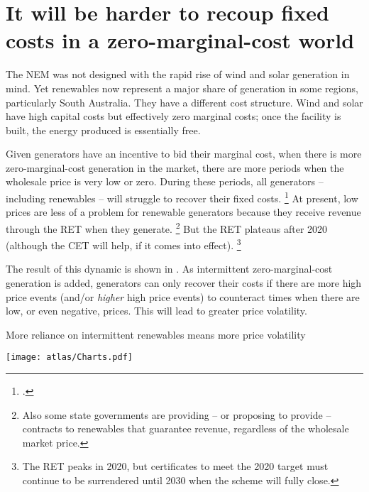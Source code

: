 \documentclass[FrontPage]{grattan}
\begin{document}
\section{It will be harder to recoup fixed costs in a zero-marginal-cost world}\label{sec:it-will-be-harder-to-recoup-fixed-costs-in-a-zero-marginal-cost-world}

The NEM was not designed with the rapid rise of wind and solar generation in mind. Yet renewables now represent a major share of generation in some regions, particularly South Australia. They have a different cost structure. Wind and solar have high capital costs but effectively zero marginal costs; once the facility is built, the energy produced is essentially free. 

Given generators have an incentive to bid their marginal cost, when there is more zero-marginal-cost generation in the market, there are more periods when the wholesale price is very low or zero. During these periods, all generators -- including renewables -- will struggle to recover their fixed costs.%
\footcite{Riesz2013CapacityMarket}
At present, low prices are less of a problem for renewable generators because they receive revenue through the RET when they generate.%
\footnote{Also some state governments are providing -- or proposing to provide -- contracts to renewables that guarantee revenue, regardless of the wholesale market price.}
But the RET plateaus after 2020 (although the CET will help, if it comes into effect).%
\footnote{The RET peaks in 2020, but certificates to meet the 2020 target must continue to be surrendered until 2030 when the scheme will fully close.}

The result of this dynamic is shown in . As intermittent zero-marginal-cost generation is added, generators can only recover their costs if there are more high price events (and/or \emph{higher} high price events) to counteract times when there are low, or even negative, prices. This will lead to greater price volatility.

\begin{figureTop}
\caption{More reliance on intermittent renewables means more price volatility}\label{fig:hypothetical-example-of-intermittent-renewables-price-volatility}
\units{}
\texttt{[image: atlas/Charts.pdf]}
\end{figureTop}
\end{document}

